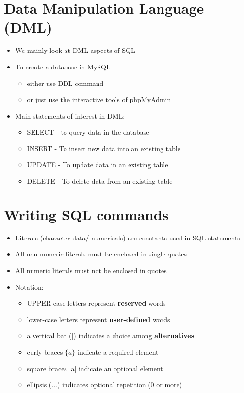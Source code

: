 \documentclass{article}[18pt]
\begin{document}
\section{Data Manipulation Language (DML)}
\begin{itemize}
	\item We mainly look at DML aspects of SQL
	\item To create a database in MySQL
	\begin{itemize}
		\item either use DDL command
		\item or just use the interactive tools of phpMyAdmin 
	\end{itemize}
	\item Main statements of interest in DML:
	\begin{itemize}
		\item SELECT - to query data in the database
		\item INSERT - To insert new data into an existing table
		\item UPDATE - To update data in an existing table
		\item DELETE - To delete data from an existing table
	\end{itemize}
\end{itemize}
\section{Writing SQL commands}
\begin{itemize}
	\item Literals (character data/ numericals) are constants used in SQL statements
	\item All non numeric literals must be enclosed in single quotes
	\item All numeric literals must not be enclosed in quotes
	\item Notation:
	\begin{itemize}
		\item UPPER-case letters represent \textbf{reserved} words
		\item lower-case letters represent \textbf{user-defined} words
		\item a vertical bar (|) indicates a choice among \textbf{alternatives}
		\item curly braces $\{a\}$ indicate a required element
		\item square braces [a] indicate an optional element
		\item ellipsis (...) indicates optional repetition (0 or more)
	\end{itemize}
\end{itemize}
\end{document}

